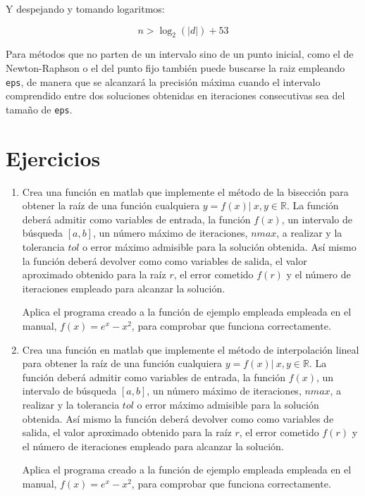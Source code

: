 Y despejando y tomando logaritmos:

\begin{equation*}
n > \log_{2}(\vert d \vert)+53
\end{equation*}

Para métodos que no parten de un intervalo sino de un punto inicial, como el de Newton-Raphson o el del punto fijo también puede buscarse la raiz empleando \texttt{eps}, de manera que se alcanzará la precisión máxima cuando el intervalo comprendido entre dos soluciones obtenidas en iteraciones consecutivas sea del tamaño de \texttt{eps}. 

\section{Ejercicios}
\begin{enumerate}
\item Crea una función en matlab que implemente el método de  la bisección para obtener la raíz de una función cualquiera $y = f(x)\vert\  x, y \in \mathbb{R}$. La función deberá admitir como variables de entrada, la función $f(x)$, un intervalo de búsqueda $[a,b]$, un número máximo de iteraciones, $nmax$, a realizar y la tolerancia $tol$ o error máximo admisible para la solución obtenida. Así mismo la función deberá devolver como como variables de salida, el valor aproximado obtenido para la raíz $r$, el error cometido $f(r)$ y el número de iteraciones empleado para alcanzar la solución. 

Aplica el programa creado a la función de ejemplo empleada empleada en el manual, $f(x) = e^x-x^2$, para comprobar que funciona correctamente.

\item Crea una función en matlab que implemente el método de  interpolación lineal para obtener la raíz de una función cualquiera $y = f(x)\vert\  x, y \in \mathbb{R}$. La función deberá admitir como variables de entrada, la función $f(x)$, un intervalo de búsqueda $[a,b]$, un número máximo de iteraciones, $nmax$, a realizar y la tolerancia $tol$ o error máximo admisible para la solución obtenida. Así mismo la función deberá devolver como como variables de salida, el valor aproximado obtenido para la raíz $r$, el error cometido $f(r)$ y el número de iteraciones empleado para alcanzar la solución.

Aplica el programa creado a la función de ejemplo empleada empleada en el manual, $f(x) = e^x-x^2$, para comprobar que funciona correctamente.


\end{enumerate}
